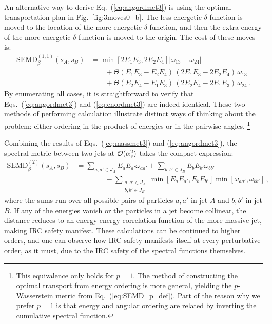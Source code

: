 \documentclass[letterpaper,11pt]{article}
\DeclareRobustCommand{\Fig}[1]{Fig.~\ref{#1}}
\DeclareRobustCommand{\Eq}[1]{Eq.~(\ref{#1})}
\DeclareRobustCommand{\Eqs}[2]{Eqs.~(\ref{#1}) and (\ref{#2})}
\begin{document}
An alternative way to derive \Eq{eq:angordmet3} is using the optimal transportation plan in \Fig{fig:3moves0_b}.
%
The less energetic $\delta$-function is moved to the location of the more energetic $\delta$-function, and then the extra energy of the more energetic $\delta$-function is moved to the origin.
% 
The cost of these moves is:
%
\begin{align}\label{eq:enordmet3}
\text{SEMD}^{(1,1)}_{\beta}(s_A, s_B) &= \min[2E_1E_3,2E_2E_4]\left|\omega_{13}-\omega_{24}\right|\\
&
\qquad+\Theta(E_1E_3-E_2E_4)\,(2E_1E_3-2E_2E_4)\,\omega_{13}\nonumber\\
&
\qquad+\Theta(E_2E_4-E_1E_3)\,(2E_2E_4-2E_1E_3)\,\omega_{24}\,.\nonumber
\end{align}
%
By enumerating all cases, it is straightforward to verify that \Eqs{eq:angordmet3}{eq:enordmet3} are indeed identical.
%
These two methods of performing calculation illustrate distinct ways of thinking about the problem:  either ordering in the product of energies or in the pairwise angles.%
%
\footnote{This equivalence only holds for $p = 1$.  The method of constructing the optimal transport from energy ordering is more general, yielding the $p$-Wasserstein metric from \Eq{eq:SEMD_p_def}.
%
Part of the reason why we prefer $p =1$ is that energy and angular ordering are related by inverting the cumulative spectral function.
}




Combining the results of \Eqs{eq:massmet3}{eq:angordmet3}, the spectral metric between two jets at ${\cal O}(\alpha_s^2)$ takes the compact expression:
%
\begin{align}\label{eq:genmetas2}
\text{SEMD}_\beta^{(2)}(s_A, s_B) &= \sum_{a,a'\in J_A }E_aE_{a'}\omega_{aa'}+\sum_{b,b'\in J_B}E_bE_{b'}\omega_{bb'}\\
&
\qquad\qquad-\sum_{\substack{a,a'\in J_A \\b,b'\in J_B}}\min[E_aE_{a'},E_bE_{b'}]\min[\omega_{aa'},\omega_{bb'}]\,,\nonumber
\end{align}
%
where the sums run over all possible pairs of particles $a,a'$ in jet $A$ and $b,b'$ in jet $B$.
%
If any of the energies vanish or the particles in a jet become collinear, the distance reduces to an energy-energy correlation function of the more massive jet, making IRC safety manifest.
%
These calculations can be continued to higher orders, and one can observe how IRC safety manifests itself at every perturbative order, as it must, due to the IRC safety of the spectral functions themselves.
\end{document}

